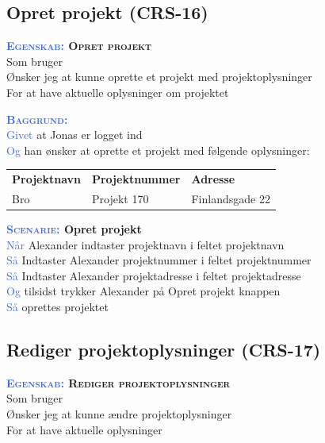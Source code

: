 \subsection{Opret projekt (CRS-16)} \label{sec:USOpretProjekt}
\textbf{\textsc{\textcolor{RoyalBlue}{Egenskab:} Opret projekt}}\\
Som bruger \\
Ønsker jeg at kunne oprette et projekt med projektoplysninger \\
For at have aktuelle oplysninger om projektet

\textsc{\textcolor{RoyalBlue}{\textbf{Baggrund:}}}\\
\textcolor{RoyalBlue}{Givet} at Jonas er logget ind\\
\textcolor{RoyalBlue}{Og} han ønsker at oprette et projekt med følgende oplysninger:\\
\begin{tabular}{| l | l | l |}
	\textbf{Projektnavn} & \textbf{Projektnummer} & \textbf{Adresse} \\
	Bro & Projekt 170 & Finlandsgade 22 \\
\end{tabular}
\newline \newline

\textbf{\textsc{\textcolor{RoyalBlue}{Scenarie:}} Opret projekt}\\
\textcolor{RoyalBlue}{Når} Alexander indtaster projektnavn i feltet projektnavn\\
\textcolor{RoyalBlue}{Så}  Indtaster Alexander projektnummer i feltet projektnummer\\
\textcolor{RoyalBlue}{Så} Indtaster Alexander projektadresse i feltet projektadresse\\
\textcolor{RoyalBlue}{Og} tilsidst trykker Alexander på Opret projekt knappen\\
\textcolor{RoyalBlue}{Så} oprettes projektet\\

\subsection{Rediger projektoplysninger (CRS-17)} \label{sec:USRedigerProjekt}
\textbf{\textsc{\textcolor{RoyalBlue}{Egenskab:} Rediger projektoplysninger}}\\
Som bruger\\
Ønsker jeg at kunne ændre projektoplysninger\\
For at have aktuelle oplysninger

